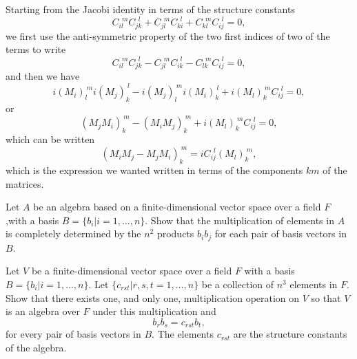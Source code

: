 \documentclass[notes.tex]{subfiles}
\begin{document}
\begin{Answer}
Starting from the Jacobi identity in terms of the structure constants
\begin{equation}
C_{il}^{~~m}C_{jk}^{~~l} + C_{jl}^{~~m}C_{ki}^{~~l} + C_{kl}^{~~m}C_{ij}^{~~l} = 0,
\end{equation}
we first use the anti-symmetric property of the two first indices of two of the terms  to write
\begin{equation}
C_{il}^{~~m}C_{jk}^{~~l} - C_{jl}^{~~m}C_{ik}^{~~l} - C_{lk}^{~~m}C_{ij}^{~~l} = 0,
\end{equation}
and then we have
\begin{equation}
i(M_i)_{l}^{~m}i(M_j)_{k}^{~l} - i(M_j)_{l}^{~m}i(M_i)_{k}^{~l} + i(M_l)_{k}^{~m}C_{ij}^{~~l} = 0,
\end{equation}
or
\begin{equation}
(M_jM_i)_{k}^{~m} - (M_iM_j)_{k}^{~m}+ i(M_l)_{k}^{~m}C_{ij}^{~~l}= 0,
\end{equation}
which can be written
\begin{equation}
(M_iM_j-M_jM_i)_{k}^{~m} =  iC_{ij}^{~~l}(M_l)_{k}^{~m},
\end{equation}
which is the expression we wanted written in terms of the components $km$ of the matrices.
\end{Answer}


\begin{Exercise}[]
Let $A$ be an algebra based on a finite-dimensional vector space over a field $F$ ,with a basis $B=\{b_i | i=1,\ldots,n\}$. Show that the multiplication of elements in $A$ is completely determined by the $n^2$ products $b_ib_j$ for each pair of basis vectors in $B$. 
\end{Exercise}

\begin{Exercise}[]
Let $V$ be a finite-dimensional vector space over a field $F$ with a basis $B=\{b_i | i=1,\ldots,n\}$. Let  $\{c_{rst}| r,s,t=1,\ldots,n\}$ be a collection of $n^3$ elements in $F$. Show that there exists one, and only one, multiplication operation on $V$ so that $V$ is an algebra over $F$ under this multiplication and
\[ b_rb_s = c_{rst}b_t,\]
for every pair of basis vectors in $B$. The elements $c_{rst}$ are the structure constants of the algebra.
\end{Exercise}
\end{document}
